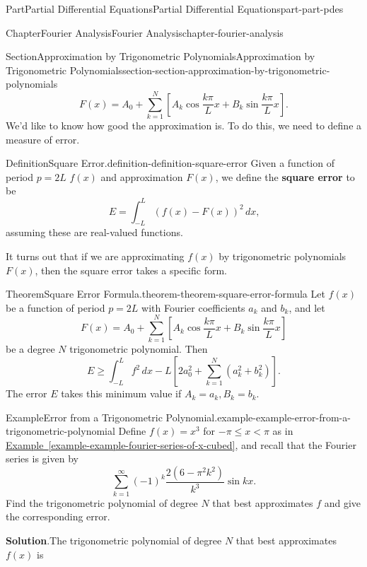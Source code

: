 \documentclass[twoside,10pt,]{book}
\newcommand{\blocktitlefont}{\relax}
\newcommand{\xreffont}{\relax}
\newcommand{\terminology}[1]{\textbf{#1}}
\numberwithin{equation}{part}
\begin{document}
\begin{partptx}{Part}{Partial Differential Equations}{}{Partial Differential Equations}{}{}{part-part-pdes}
\begin{chapterptx}{Chapter}{Fourier Analysis}{}{Fourier Analysis}{}{}{chapter-fourier-analysis}
\begin{sectionptx}{Section}{Approximation by Trigonometric Polynomials}{}{Approximation by Trigonometric Polynomials}{}{}{section-section-approximation-by-trigonometric-polynomials}
\begin{equation*}
F(x) = A_{0} + \sum_{k=1}^{N}[A_{k}\cos\frac{k\pi}{L}x + B_{k}\sin\frac{k\pi}{L}x]\text{.}
\end{equation*}
We'd like to know how good the approximation is. To do this, we need to define a measure of error.%
\begin{definition}{Definition}{Square Error.}{definition-definition-square-error}%
Given a function of period \(p = 2L\) \(f(x)\) and approximation \(F(x)\), we define the \terminology{square error} to be%
\begin{equation*}
E = \int_{-L}^{L}(f(x) - F(x))^{2}\,dx\text{,}
\end{equation*}
assuming these are real-valued functions.%
\end{definition}
It turns out that if we are approximating \(f(x)\) by trigonometric polynomials \(F(x)\), then the square error takes a specific form.%
\begin{theorem}{Theorem}{Square Error Formula.}{}{theorem-theorem-square-error-formula}%
Let \(f(x)\) be a function of period \(p = 2L\) with Fourier coefficients \(a_{k}\) and \(b_{k}\), and let%
\begin{equation*}
F(x) = A_{0} + \sum_{k=1}^{N}[A_{k}\cos\frac{k\pi}{L}x + B_{k}\sin\frac{k\pi}{L}x]
\end{equation*}
be a degree \(N\) trigonometric polynomial. Then%
\begin{equation*}
E \geq \int_{-L}^{L}f^{2}\,dx - L\left[2a_{0}^{2} + \sum_{k=1}^{N}(a_{k}^{2} + b_{k}^{2})\right]\text{.}
\end{equation*}
The error \(E\) takes this minimum value if \(A_{k} = a_{k}, B_{k} = b_{k}\).%
\end{theorem}
\begin{example}{Example}{Error from a Trigonometric Polynomial.}{example-example-error-from-a-trigonometric-polynomial}%
Define \(f(x) = x^{3}\) for \(-\pi\leq x < \pi\) as in \hyperref[example-example-fourier-series-of-x-cubed]{Example~{\xreffont\ref{example-example-fourier-series-of-x-cubed}}}, and recall that the Fourier series is given by%
\begin{equation*}
\sum_{k = 1}^{\infty}(-1)^{k}\frac{2(6 - \pi^{2}k^{2})}{k^{3}}\sin kx\text{.}
\end{equation*}
Find the trigonometric polynomial of degree \(N\) that best approximates \(f\) and give the corresponding error.%
\par\smallskip%
\noindent\textbf{\blocktitlefont Solution}.\hypertarget{solution-example-error-from-a-trigonometric-polynomial-c}{}\quad{}The trigonometric polynomial of degree \(N\) that best approximates \(f(x)\) is%

\end{example}
\end{sectionptx}
\end{chapterptx}
\end{partptx}
\end{document}
